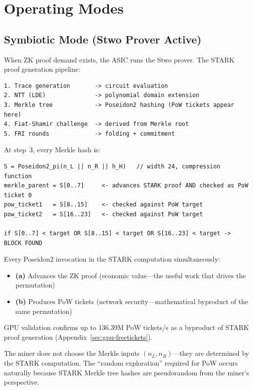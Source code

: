\documentclass[11pt,a4paper]{article}
\begin{document}
\section{Operating Modes}
\label{sec:modes}

\subsection{Symbiotic Mode (Stwo Prover Active)}
\label{sec:symbiotic}

When ZK proof demand exists, the ASIC runs the Stwo prover. The STARK proof generation pipeline:

\begin{Verbatim}[fontsize=\small]
1. Trace generation       -> circuit evaluation
2. NTT (LDE)              -> polynomial domain extension
3. Merkle tree            -> Poseidon2 hashing (PoW tickets appear here)
4. Fiat-Shamir challenge  -> derived from Merkle root
5. FRI rounds             -> folding + commitment
\end{Verbatim}

At step~3, every Merkle hash is:
\begin{Verbatim}[fontsize=\small]
S = Poseidon2_pi(n_L || n_R || h_H)   // width 24, compression function
merkle_parent = S[0..7]     <- advances STARK proof AND checked as PoW ticket 0
pow_ticket1   = S[8..15]    <- checked against PoW target
pow_ticket2   = S[16..23]   <- checked against PoW target

if S[0..7] < target OR S[8..15] < target OR S[16..23] < target -> BLOCK FOUND
\end{Verbatim}

Every Poseidon2 invocation in the STARK computation simultaneously:
\begin{itemize}
\item \textbf{(a)} Advances the ZK proof (economic value---the useful work that drives the permutation)
\item \textbf{(b)} Produces PoW tickets (network security---mathematical byproduct of the same permutation)
\end{itemize}
GPU validation confirms up to 136.39M PoW tickets/s as a byproduct of STARK proof generation (Appendix~\ref{sec:gpu-freetickets}).

The miner does not choose the Merkle inputs $(n_L, n_R)$---they are determined by the STARK computation. The ``random exploration'' required for PoW occurs naturally because STARK Merkle tree hashes are pseudorandom from the miner's perspective.
\end{document}
